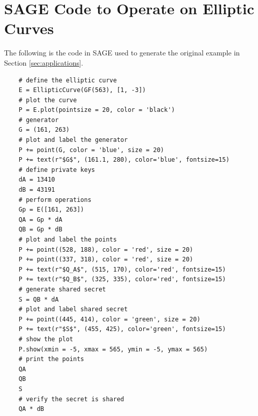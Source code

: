 \documentclass[]{../../math_paper}
\begin{document}
\section{SAGE Code to Operate on Elliptic Curves}
\label{sec:code}
The following is the code in SAGE used to generate the original example in Section \ref{sec:applications}.
\begin{lstlisting}
    # define the elliptic curve
    E = EllipticCurve(GF(563), [1, -3])
    # plot the curve
    P = E.plot(pointsize = 20, color = 'black')
    # generator
    G = (161, 263)
    # plot and label the generator
    P += point(G, color = 'blue', size = 20)
    P += text(r"$G$", (161.1, 280), color='blue', fontsize=15)
    # define private keys 
    dA = 13410
    dB = 43191
    # perform operations
    Gp = E([161, 263]) 
    QA = Gp * dA
    QB = Gp * dB
    # plot and label the points
    P += point((528, 188), color = 'red', size = 20)
    P += point((337, 318), color = 'red', size = 20)
    P += text(r"$Q_A$", (515, 170), color='red', fontsize=15)
    P += text(r"$Q_B$", (325, 335), color='red', fontsize=15)
    # generate shared secret
    S = QB * dA
    # plot and label shared secret
    P += point((445, 414), color = 'green', size = 20)
    P += text(r"$S$", (455, 425), color='green', fontsize=15)
    # show the plot
    P.show(xmin = -5, xmax = 565, ymin = -5, ymax = 565)
    # print the points 
    QA
    QB
    S
    # verify the secret is shared 
    QA * dB
\end{lstlisting}
\end{document}
